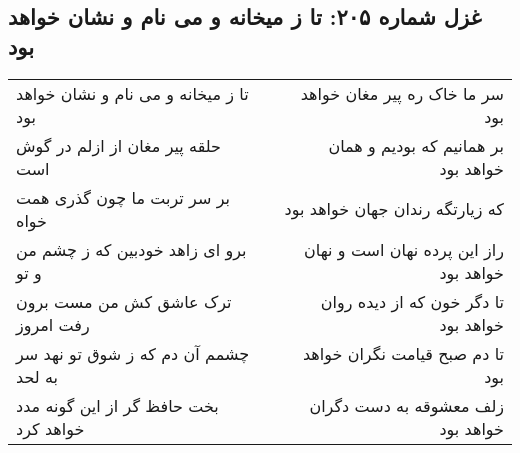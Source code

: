 \begin{center}
\section*{غزل شماره ۲۰۵: تا ز میخانه و می نام و نشان خواهد بود}
\label{sec:sh205}
\begin{longtable}{l p{0.5cm} r}
تا ز میخانه و می نام و نشان خواهد بود
&&
سر ما خاک ره پیر مغان خواهد بود
\\
حلقه پیر مغان از ازلم در گوش است
&&
بر همانیم که بودیم و همان خواهد بود
\\
بر سر تربت ما چون گذری همت خواه
&&
که زیارتگه رندان جهان خواهد بود
\\
برو ای زاهد خودبین که ز چشم من و تو
&&
راز این پرده نهان است و نهان خواهد بود
\\
ترک عاشق کش من مست برون رفت امروز
&&
تا دگر خون که از دیده روان خواهد بود
\\
چشمم آن دم که ز شوق تو نهد سر به لحد
&&
تا دم صبح قیامت نگران خواهد بود
\\
بخت حافظ گر از این گونه مدد خواهد کرد
&&
زلف معشوقه به دست دگران خواهد بود
\\
\end{longtable}
\end{center}
